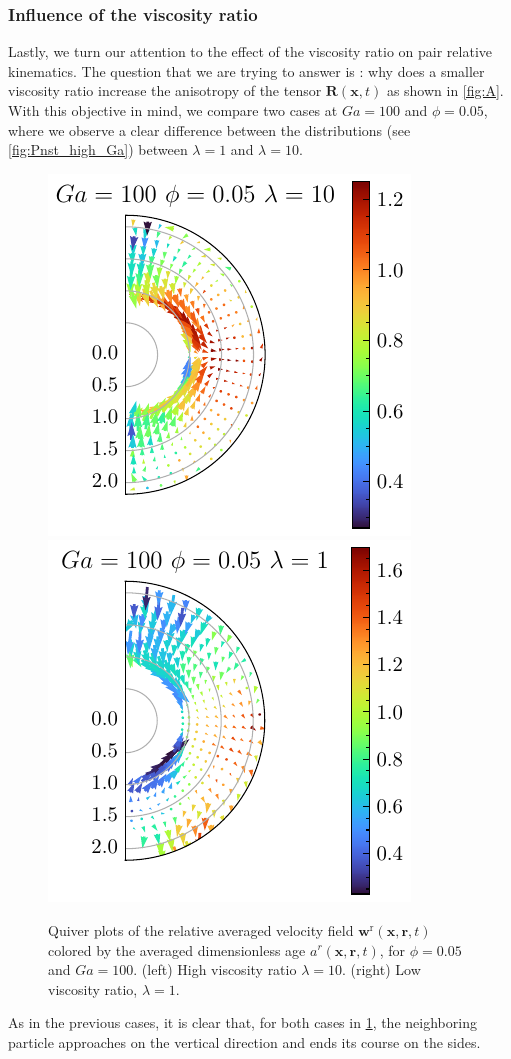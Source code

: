\subsubsection{Influence of the viscosity ratio}

Lastly, we turn our attention to the effect of the viscosity ratio on pair relative kinematics. 
The question that we are trying to answer is : why does a smaller viscosity ratio increase the anisotropy of the tensor $\textbf{R}(\textbf{x},t)$ as shown in \ref{fig:A}. 
With this objective in mind, we compare two cases at $Ga = 100$ and $\phi =0.05$, where we observe a clear difference between the distributions (see \ref{fig:Pnst_high_Ga}) between $\lambda = 1$ and $\lambda = 10$.
\begin{figure}[h!]
    \centering
    \includegraphics[height=0.35\textwidth]{image/HOMOGENEOUS_NEW/Dist/U_rel_l_10_Ga_100_PHI_5.pdf}
    \includegraphics[height=0.35\textwidth]{image/HOMOGENEOUS_NEW/Dist/U_rel_l_1_Ga_100_PHI_5.pdf}
    \caption{Quiver plots of the relative averaged velocity field $\textbf{w}^\text{r}(\textbf{x},\textbf{r},t)$ colored by the averaged dimensionless age $a^r(\textbf{x},\textbf{r},t)$, for $\phi = 0.05$ and $Ga = 100$. 
    (left) High viscosity ratio $\lambda = 10$.
    (right) Low viscosity ratio, $\lambda = 1$. }
    \label{fig:Why_l_matter}
\end{figure}
As in the previous cases, it is clear that, for both cases in \ref{fig:Why_l_matter}, the neighboring particle approaches on the vertical direction and ends its course on the sides.
